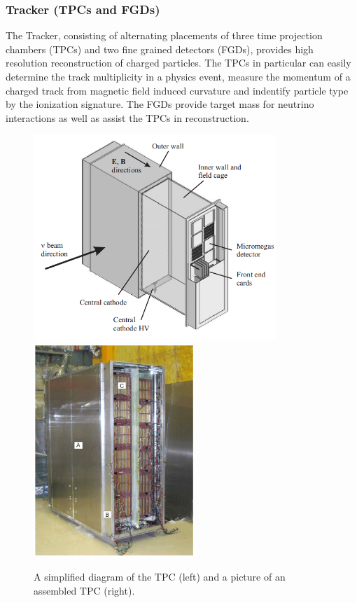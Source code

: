 \subsubsection{Tracker (TPCs and FGDs)}

The Tracker, consisting of alternating placements of three time projection chambers (TPCs) and
two fine grained detectors (FGDs), provides high resolution
reconstruction of charged particles. The TPCs in particular can easily
determine the track multiplicity in a physics event, measure the
momentum of a charged track from magnetic field induced curvature and
indentify particle type by the ionization signature. The FGDs
provide target mass for neutrino interactions as well as assist the
TPCs in reconstruction. 

\begin{figure}[h]
\begin{center}
\includegraphics[width=3.6in]{./Figures/tpc1.png}
\includegraphics[width=2.4in]{./Figures/tpc2.png}
\end{center}
\caption{A simplified diagram of the TPC (left) and a picture of an
  assembled TPC (right).}
\label{fig:tpc}
\end{figure}

